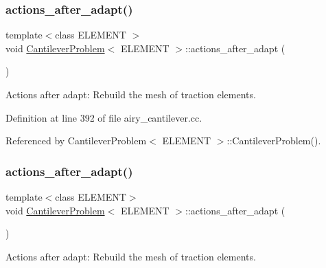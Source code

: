 \subsubsection{\texorpdfstring{actions\+\_\+after\+\_\+adapt()}{actions\_after\_adapt()}\hspace{0.1cm}{\footnotesize\ttfamily [1/2]}}
{\footnotesize\ttfamily template$<$class E\+L\+E\+M\+E\+NT $>$ \\
void \hyperlink{classCantileverProblem}{Cantilever\+Problem}$<$ E\+L\+E\+M\+E\+NT $>$\+::actions\+\_\+after\+\_\+adapt (\begin{DoxyParamCaption}{ }\end{DoxyParamCaption})}



Actions after adapt\+: Rebuild the mesh of traction elements. 



Definition at line 392 of file airy\+\_\+cantilever.\+cc.



Referenced by Cantilever\+Problem$<$ E\+L\+E\+M\+E\+N\+T $>$\+::\+Cantilever\+Problem().

\mbox{\label{classCantileverProblem_af4d135ace3eac657b38de362e1644c75}} 
\subsubsection{\texorpdfstring{actions\+\_\+after\+\_\+adapt()}{actions\_after\_adapt()}\hspace{0.1cm}{\footnotesize\ttfamily [2/2]}}
{\footnotesize\ttfamily template$<$class E\+L\+E\+M\+E\+NT$>$ \\
void \hyperlink{classCantileverProblem}{Cantilever\+Problem}$<$ E\+L\+E\+M\+E\+NT $>$\+::actions\+\_\+after\+\_\+adapt (\begin{DoxyParamCaption}{ }\end{DoxyParamCaption})}



Actions after adapt\+: Rebuild the mesh of traction elements. 

\mbox{\label{classCantileverProblem_a4a70a4328d287aaa15c7811562122013}} 
